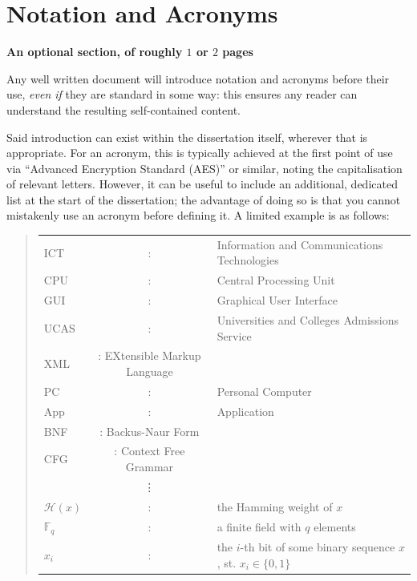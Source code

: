 \documentclass[ %
                    author={Jonathan Rankin},
                supervisor={Dr. David May, Dr. Ian Holyer},
                    degree={MEng},
                     title={CodeTouch},
                  subtitle={A Revolutionary Way To Program Real Code On Touch Screen Devices},
                      type={enterprise},
                      year={2015 } ]{dissertation}
\begin{document}

\chapter*{Notation and Acronyms}

{\bf An optional section, of roughly $1$ or $2$ pages}
\vspace{1cm} 

\noindent
Any well written document will introduce notation and acronyms before
their use, {\em even if} they are standard in some way: this ensures 
any reader can understand the resulting self-contained content.  

Said introduction can exist within the dissertation itself, wherever 
that is appropriate.  For an acronym, this is typically achieved at 
the first point of use via ``Advanced Encryption Standard (AES)'' or 
similar, noting the capitalisation of relevant letters.  However, it 
can be useful to include an additional, dedicated list at the start 
of the dissertation; the advantage of doing so is that you cannot 
mistakenly use an acronym before defining it.  A limited example is 
as follows:

\begin{quote}
\noindent
\begin{tabular}{lcl}
ICT               &:     & Information and Communications Technologies                                        \\
CPU                &:     & Central Processing Unit                                            \\
GUI            &:     & Graphical User Interface                                      \\
UCAS           &:     & Universities and Colleges Admissions Service \\
XML           &:    EXtensible Markup Language \\
PC       &:     & Personal Computer \\
App      &:     & Application \\
BNF   &: Backus-Naur Form \\
CFG   &: Context Free Grammar\\
                    &\vdots&                                                                      \\
${\mathcal H}( x )$ &:     & the Hamming weight of $x$                                            \\
${\mathbb  F}_q$    &:     & a finite field with $q$ elements                                     \\
$x_i$               &:     & the $i$-th bit of some binary sequence $x$, st. $x_i \in \{ 0, 1 \}$ \\
\end{tabular}
\end{quote}
\end{document}
